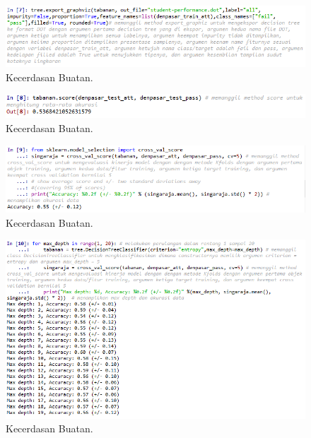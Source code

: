 
\hfill\break
\begin{figure}[H]
    \includegraphics[width=1\textwidth]{figures/1174006/chapter2/praktek/7.png}
    \centering
    \caption{Kecerdasan Buatan.}
\end{figure}


\hfill\break
\begin{figure}[H]
    \includegraphics[width=1\textwidth]{figures/1174006/chapter2/praktek/8.png}
    \centering
    \caption{Kecerdasan Buatan.}
\end{figure}


\hfill\break
\begin{figure}[H]
    \includegraphics[width=1\textwidth]{figures/1174006/chapter2/praktek/9.png}
    \centering
    \caption{Kecerdasan Buatan.}
\end{figure}


\hfill\break
\begin{figure}[H]
    \includegraphics[width=1\textwidth]{figures/1174006/chapter2/praktek/10.png}
    \centering
    \caption{Kecerdasan Buatan.}
\end{figure}

